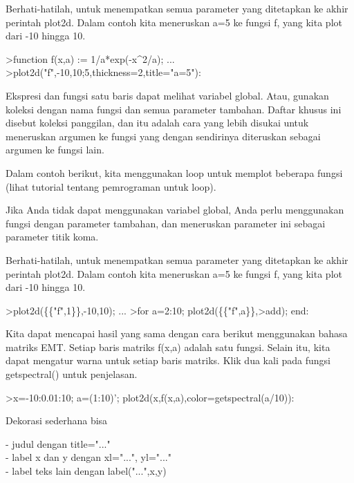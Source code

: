 \documentclass[a4paper,10pt]{article}
\begin{document}
\begin{eulernotebook}
\begin{eulercomment}
\begin{eulercomment}
\begin{eulercomment}
\begin{eulercomment}
\begin{eulercomment}
\begin{eulercomment}
\begin{eulercomment}
\begin{eulercomment}
\begin{eulercomment}
\begin{eulercomment}
\begin{eulercomment}
\begin{eulercomment}
\begin{eulercomment}
\begin{eulercomment}
\begin{eulercomment}
Berhati-hatilah, untuk menempatkan semua parameter yang ditetapkan ke
akhir perintah plot2d. Dalam contoh kita meneruskan a=5 ke fungsi f,
yang kita plot dari -10 hingga 10.
\end{eulercomment}
\begin{eulerprompt}
>function f(x,a) := 1/a*exp(-x^2/a); ...
>plot2d("f",-10,10;5,thickness=2,title="a=5"):
\end{eulerprompt}
\begin{eulercomment}
Ekspresi dan fungsi satu baris dapat melihat variabel global. Atau,
gunakan koleksi dengan nama fungsi dan semua parameter tambahan.
Daftar khusus ini disebut koleksi panggilan, dan itu adalah cara yang
lebih disukai untuk meneruskan argumen ke fungsi yang dengan
sendirinya diteruskan sebagai argumen ke fungsi lain.

Dalam contoh berikut, kita menggunakan loop untuk memplot beberapa
fungsi (lihat tutorial tentang pemrograman untuk loop).

Jika Anda tidak dapat menggunakan variabel global, Anda perlu
menggunakan fungsi dengan parameter tambahan, dan meneruskan parameter
ini sebagai parameter titik koma.

Berhati-hatilah, untuk menempatkan semua parameter yang ditetapkan ke
akhir perintah plot2d. Dalam contoh kita meneruskan a=5 ke fungsi f,
yang kita plot dari -10 hingga 10.
\end{eulercomment}
\begin{eulerprompt}
>plot2d(\{\{"f",1\}\},-10,10); ...
>for a=2:10; plot2d(\{\{"f",a\}\},>add); end:
\end{eulerprompt}
\begin{eulercomment}
Kita dapat mencapai hasil yang sama dengan cara berikut menggunakan
bahasa matriks EMT. Setiap baris matriks f(x,a) adalah satu fungsi.
Selain itu, kita dapat mengatur warna untuk setiap baris matriks. Klik
dua kali pada fungsi getspectral() untuk penjelasan.
\end{eulercomment}
\begin{eulerprompt}
>x=-10:0.01:10; a=(1:10)'; plot2d(x,f(x,a),color=getspectral(a/10)):
\end{eulerprompt}
\begin{eulercomment}
Dekorasi sederhana bisa

- judul dengan title="..."\\
- label x dan y dengan xl="...", yl="..."\\
- label teks lain dengan label("...",x,y)


\end{eulercomment}
\end{eulercomment}
\end{eulercomment}
\end{eulercomment}
\end{eulercomment}
\end{eulercomment}
\end{eulercomment}
\end{eulercomment}
\end{eulercomment}
\end{eulercomment}
\end{eulercomment}
\end{eulercomment}
\end{eulercomment}
\end{eulercomment}
\end{eulercomment}
\end{eulernotebook}
\end{document}
